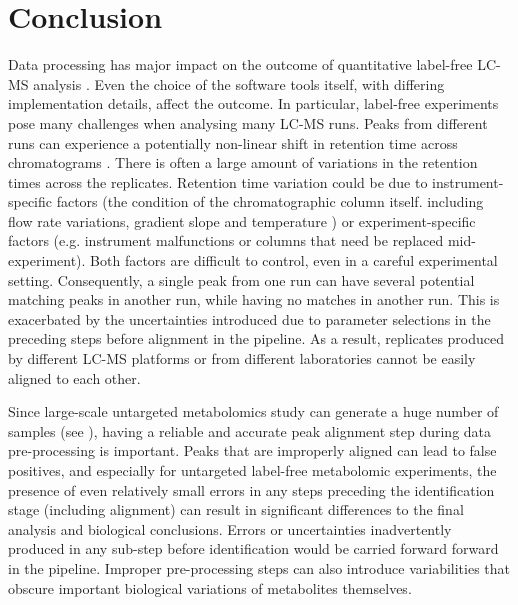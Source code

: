 \section{Conclusion}

Data processing has major impact on the outcome of quantitative label-free LC-MS analysis \cite{Chawade2015}. Even the choice of the software tools itself, with differing implementation details, affect the outcome. In particular, label-free experiments pose many challenges when analysing many LC-MS runs. Peaks from different runs can experience a potentially non-linear shift in retention time across chromatograms \cite{Podwojski2009}. There is often a large amount of variations in the retention times across the replicates. Retention time variation could be due to instrument-specific factors (the condition of the chromatographic column itself. including flow rate variations, gradient slope and temperature \cite{Christin2008}) or experiment-specific factors (e.g. instrument malfunctions or columns that need be replaced mid-experiment). Both factors are difficult to control, even in a careful experimental setting. Consequently, a single peak from one run can have several potential matching peaks in another run, while having no matches in another run. This is exacerbated by the uncertainties introduced due to parameter selections in the preceding steps before alignment in the pipeline. As a result, replicates produced by different LC-MS platforms or from different laboratories cannot be easily aligned to each other. 

Since large-scale untargeted metabolomics study can generate a huge number of samples (see \cite{DeVos2007a,Creek2011}), having a reliable and accurate peak alignment step during data pre-processing is important. Peaks that are improperly aligned can lead to false positives, and especially for untargeted label-free metabolomic experiments, the presence of even relatively small errors in any steps preceding the identification stage (including alignment) can result in significant differences to the final analysis and biological conclusions. Errors or uncertainties inadvertently produced in any sub-step before identification would be carried forward forward in the pipeline. Improper pre-processing steps can also introduce variabilities that obscure important biological variations of metabolites themselves. 

